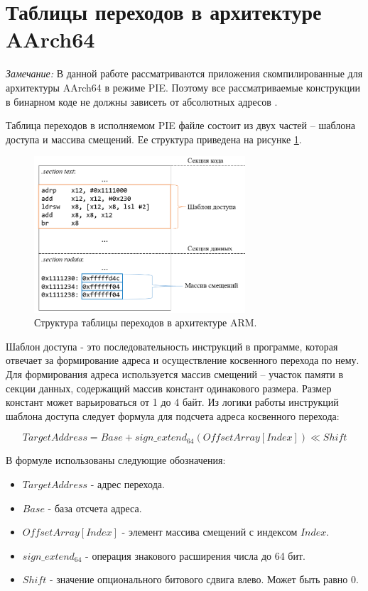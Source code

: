 \documentclass{mipt-thesis-bs}
\begin{document}
    \section{Таблицы переходов в архитектуре AArch64}
    \textit{Замечание:} В данной работе рассматриваются приложения скомпилированные для архитектуры AArch64 в режиме PIE. Поэтому все рассматриваемые конструкции в бинарном коде не должны зависеть от абсолютных адресов \cite{repica}.

    Таблица переходов в исполняемом PIE файле состоит из двух частей – шаблона доступа и массива смещений. Ее структура приведена на рисунке \ref{fig:jtoverview}.

    \begin{figure}[h!]
        \centering
        \includegraphics[width=0.7\textwidth]{pics/JumpTableOverview.png}
        \caption{Структура таблицы переходов в архитектуре ARM.}
        \label{fig:jtoverview}
    \end{figure}

    Шаблон доступа - это последовательность инструкций в программе, которая отвечает за формирование адреса и осуществление косвенного перехода по нему. Для формирования адреса используется массив смещений – участок памяти в секции данных, содержащий массив констант одинакового размера. Размер констант может варьироваться от 1 до 4 байт. Из логики работы инструкций шаблона доступа следует формула для подсчета адреса косвенного перехода:

    \begin{equation}
        TargetAddress = Base + sign\_extend_{64}(OffsetArray[Index]) \ll Shift
        \label{eq:jt_adr_calculation}
    \end{equation}

    В формуле  использованы следующие обозначения:

    \begin{itemize}
        \item $Target Address$ - адрес перехода.
        \item $Base$ - база отсчета адреса.
        \item $OffsetArray[Index]$ - элемент массива смещений с индексом $Index$.
        \item $sign\_extend_{64}$ - операция знакового расширения числа до 64 бит.
        \item $Shift$ - значение опционального битового сдвига влево. Может быть равно 0.
    \end{itemize}
\end{document}
